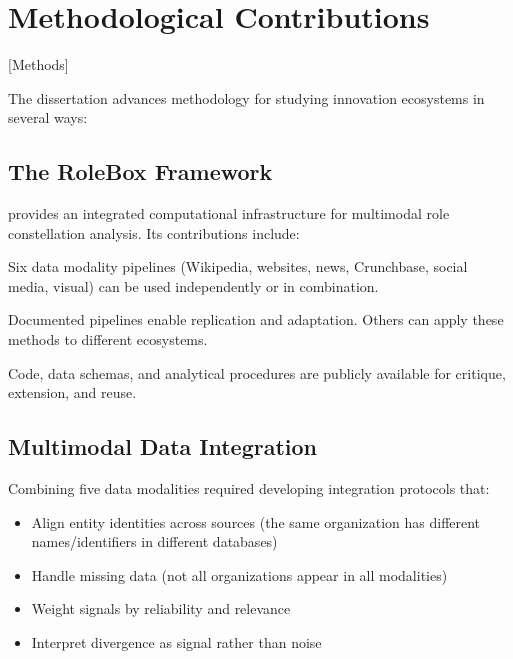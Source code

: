 \documentclass[../main.tex]{subfiles}
\begin{document}
\section{Methodological Contributions}[Methods]

The dissertation advances methodology for studying innovation ecosystems in several ways:

\subsection{The RoleBox Framework}

\RoleBox{} provides an integrated computational infrastructure for multimodal role constellation analysis. Its contributions include:

\begin{description}[leftmargin=0.5cm, itemsep=0.3em]
\item[Modular Architecture] Six data modality pipelines (Wikipedia, websites, news, Crunchbase, social media, visual) can be used independently or in combination.

\item[Reproducible Workflows] Documented pipelines enable replication and adaptation. Others can apply these methods to different ecosystems.

\item[Open Infrastructure] Code, data schemas, and analytical procedures are publicly available for critique, extension, and reuse.
\end{description}

\subsection{Multimodal Data Integration}

Combining five data modalities required developing integration protocols that:

\begin{itemize}[leftmargin=*, itemsep=0.3em]
\item Align entity identities across sources (the same organization has different names/identifiers in different databases)
\item Handle missing data (not all organizations appear in all modalities)
\item Weight signals by reliability and relevance
\item Interpret divergence as signal rather than noise
\end{itemize}
\end{document}
